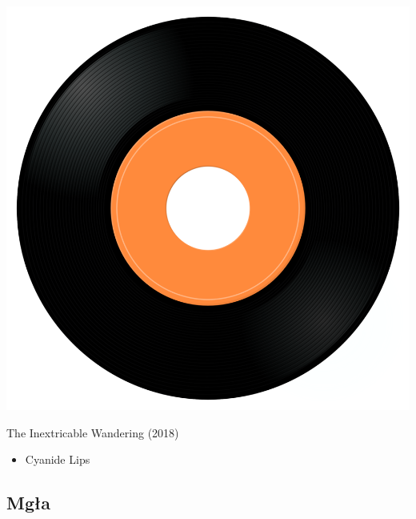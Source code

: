 \begin{minipage}[t]{0.25\textwidth}
\captionsetup{type=figure}
\includegraphics[width=\textwidth]{Images/cover.png}
\caption*{The Inextricable Wandering (2018)}
\end{minipage}
\begin{minipage}[t]{0.25\textwidth}\vspace{0pt}
\begin{itemize}[nosep,leftmargin=1em,labelwidth=*,align=left]
	\setlength{\itemsep}{0pt}
	\item Cyanide Lips
\end{itemize}
\end{minipage}

\subsection{Mgła}

